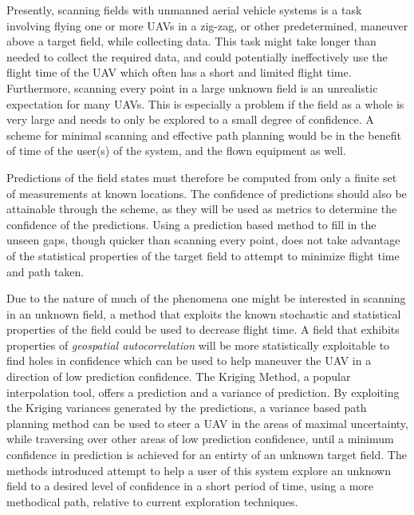 Presently, scanning fields with unmanned aerial vehicle systems is a task involving flying one or more UAVs in a zig-zag, or other predetermined, maneuver above a target field, while collecting data. This task might take longer than needed to collect the required data, and could potentially ineffectively use the flight time of the UAV which often has a short and limited flight time. Furthermore, scanning every point in a large unknown field is an unrealistic expectation for many UAVs. This is especially a problem if the field as a whole is very large and needs to only be explored to a small degree of confidence. A scheme for minimal scanning and effective path planning would be in the benefit of time of the user(s) of the system, and the flown equipment as well. 

Predictions of the field states must therefore be computed from only a finite set of measurements at known locations. The confidence of predictions should also be attainable through the scheme, as they will be used as metrics to determine the confidence of the predictions. Using a prediction based method to fill in the unseen gaps, though quicker than scanning every point, does not take advantage of the statistical properties of the target field to attempt to minimize flight time and path taken. 

Due to the nature of much of the phenomena one might be interested in scanning in an unknown field, a method that exploits the known stochastic and statistical properties of the field could be used to decrease flight time. A field that exhibits properties of \textit{geospatial autocorrelation} will be more statistically exploitable to find holes in confidence which can be used to help maneuver the UAV in a direction of low prediction confidence. The Kriging Method, a popular interpolation tool, offers a prediction and a variance of prediction. By exploiting the Kriging variances generated by the predictions, a variance based path planning method can be used to steer a UAV in the areas of maximal uncertainty, while traversing over other areas of low prediction confidence, until a minimum confidence in prediction is achieved for an entirty of an unknown target field. The methods introduced attempt to help a user of this system explore an unknown field to a desired level of confidence in a short period of time, using a more methodical path, relative to current exploration techniques. 

